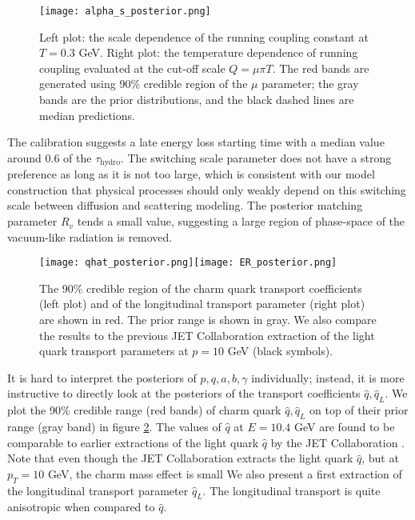 \begin{figure}
\singlespacing
\centering
\texttt{[image: alpha\_s\_posterior.png]}
\caption[Left plot: the scale dependence of the running coupling constant at]{Left plot: the scale dependence of the running coupling constant at $T=0.3$ GeV. Right plot: the temperature dependence of running coupling evaluated at the cut-off scale $Q=\mu\pi T$. The red bands are generated using 90\% credible region of the $\mu$ parameter; the gray bands are the prior distributions, and the black dashed lines are median predictions.}
\label{fig:new:posterior-alphas}
\end{figure}

The calibration suggests a late energy loss starting time with a median value around 0.6 of the $\tau_{\textrm{hydro}}$.
The switching scale parameter does not have a strong preference as long as it is not too large, which is consistent with our model construction that physical processes should only weakly depend on this switching scale between diffusion and scattering modeling.
The posterior matching parameter $R_v$ tends a small value, suggesting a large region of phase-space of the vacuum-like radiation is removed.
\begin{figure}
\singlespacing
\centering
\texttt{[image: qhat\_posterior.png]}\texttt{[image: ER\_posterior.png]}
\caption[The 90\% credible region of the charm quark transport coefficients]{The 90\% credible region of the charm quark transport coefficients (left plot) and of the longitudinal transport parameter (right plot) are shown in red. The prior range is shown in gray. We also compare the results to the previous JET Collaboration extraction of the light quark transport parameters at $p=10$ GeV (black symbols). }
\label{fig:new:posterior-qhat}
\end{figure}

It is hard to interpret the posteriors of $p, q, a, b, \gamma$ individually; instead, it is more instructive to directly look at the posteriors of the transport coefficients $\hat{q}, \hat{q}_L$.
We plot the 90\% credible range (red bands) of charm quark $\hat{q}, \hat{q}_L$ on top of their prior range (gray band) in figure \ref{fig:new:posterior-qhat}.
The values of $\hat{q}$ at $E=10.4$ GeV are found to be comparable to earlier extractions of the light quark $\hat{q}$ by the JET Collaboration \cite{Burke:2013yra}. 
Note that even though the JET Collaboration extracts the light quark $\hat{q}$, but at $p_T = 10$ GeV, the charm mass effect is small
We also present a first extraction of the longitudinal transport parameter $\hat{q}_L$. 
The longitudinal transport is quite anisotropic when compared to $\hat{q}$.

